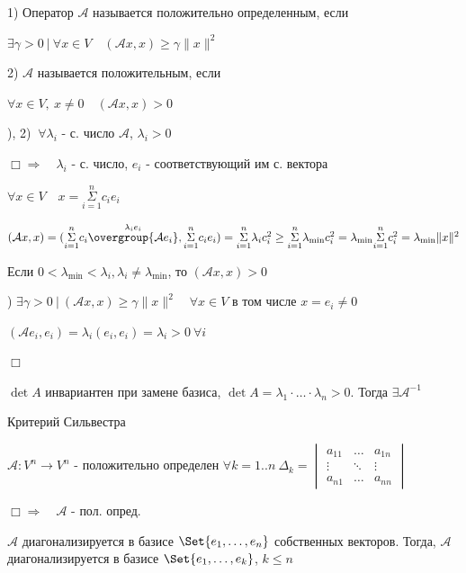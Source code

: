 \documentclass[12pt]{article}
\begin{document}
    1) Оператор $\mathcal{A}$ называется положительно определенным, если

    $\exists \gamma > 0 \ | \ \forall x \in V \quad (\mathcal{A}x, x) \geq \gamma \|x\|^2$

    2) $\mathcal{A}$ называется положительным, если

    $\forall x \in V, \ x \neq 0 \quad (\mathcal{A}x, x) > 0$

    ), 2) \Longleftrightarrow $\ \forall \lambda_i$ - с. число $\mathcal{A}$, $\lambda_i > 0$

    $\Box \Longrightarrow \quad \lambda_i$ - с. число, $e_i$ - соответствующий им с. вектора

    $\forall x \in V \quad x = \overset{n}{\underset{i = 1}{\Sigma}} c_i e_i$

    $(\mathcal{A}x, x) = (\overset{n}{\underset{i = 1}{\Sigma}} c_i \overset{\lambda_i e_i}{\overgroup{\mathcal{A}e_i}}, \overset{n}{\underset{i = 1}{\Sigma}} c_i e_i) =
    \overset{n}{\underset{i = 1}{\Sigma}} \lambda_i c_i^2 \geq \overset{n}{\underset{i = 1}{\Sigma}}\lambda_{\min} c_i^2 =
    \lambda_{\min} \overset{n}{\underset{i = 1}{\Sigma}}c_i^2 = \lambda_{\min} \|x\|^2$

    Если $0 < \lambda_{\min} < \lambda_i, \lambda_i \neq \lambda_{\min}$, то $(\mathcal{A}x, x) > 0$

    \Longleftarrow {}) \Longleftrightarrow $\exists \gamma > 0 \ | \ (\mathcal{A}x, x) \geq \gamma \|x\|^2 \quad \forall x \in V$ в том числе $x = e_i \neq 0$

    $(\mathcal{A}e_i, e_i) = \lambda_i (e_i, e_i) = \lambda_i > 0 \ \forall i$

    $\Box$

    \Nota $\det A$ инвариантен при замене базиса, $\det A = \lambda_1 \cdot \dots \cdot \lambda_n > 0$. Тогда $\exists \mathcal{A}^{-1}$

    \Th Критерий Сильвестра

    $\mathcal{A}: V^n \to V^n$ - положительно определен \Longleftrightarrow $\forall k = 1..n \ \Delta_k =
    \begin{vmatrix}a_{11} & \dots & a_{1n} \\ \vdots & \ddots & \vdots \\ a_{n1} & \dots & a_{nn}\end{vmatrix}$

    $\Box \Longrightarrow \quad \mathcal{A}$ - пол. опред.

    $\mathcal{A}$ диагонализируется в базисе $\Set{e_1, \dots, e_n}$ собственных векторов.
    Тогда, $\mathcal{A}$ диагонализируется в базисе $\Set{e_1, \dots, e_k}$, $k \leq n$
\end{document}
